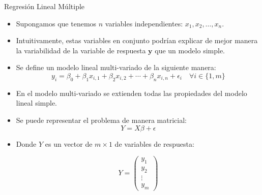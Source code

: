 \documentclass[handout]{beamer}
\begin{document}
\begin{frame}{Regresión Lineal Múltiple}
\scriptsize{
\begin{itemize}
 \item Supongamos que tenemos $n$ variables independientes: $x_1,x_2,\dots,x_n$.
 \item Intuitivamente, estas variables en conjunto podrían explicar de mejor manera la variabilidad de la variable de respuesta $\mathbf{y}$ que un modelo simple.
 \item Se define un modelo lineal multi-variado de la siguiente manera:
 \begin{displaymath}
 y_i=\beta_{0}+\beta_{1}x_{i,1}+ \beta_{2}x_{i,2} + \cdots + \beta_{n}x_{i,n} +  \epsilon_i \quad \forall i \in \{1,m\}
\end{displaymath}
\item En el modelo multi-variado se extienden todas las propiedades del modelo lineal simple.

\item Se puede representar el problema de manera matricial:
\begin{displaymath}
 Y=X\beta+\epsilon
\end{displaymath}

\item Donde $Y$ es un vector de $m\times 1$ de variables de respuesta:

\begin{displaymath}
 Y =
 \begin{pmatrix}
  y_{1} \\
  y_{2}  \\
  \vdots  \\
  y_{m}
 \end{pmatrix}
\end{displaymath}






\end{itemize}
 

}
\end{frame}
\end{document}
